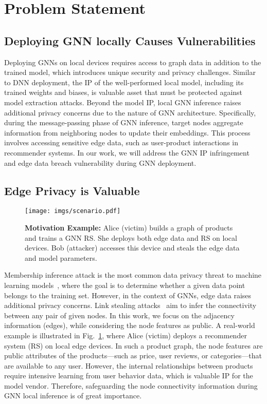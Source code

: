 \section{Problem Statement} \label{sec: statement}


\subsection{Deploying GNN locally Causes Vulnerabilities} \label{ps: gnn inference}
Deploying GNNs on local devices requires access to graph data in addition to the trained model, which introduces unique security and privacy challenges. 
Similar to DNN deployment, the IP of the well-performed local model, including its trained weights and biases, is valuable asset that must be protected against model extraction attacks.
Beyond the model IP, local GNN inference raises additional privacy concerns due to the nature of GNN architecture. 
Specifically, during the message-passing phase of GNN inference, target nodes aggregate information from neighboring nodes to update their embeddings. 
This process involves accessing sensitive edge data, such as user-product interactions in recommender systems.
In our work, we will address the GNN IP infringement and edge data breach vulnerability during GNN deployment.

\subsection{Edge Privacy is Valuable} \label{motivation: edge importance}

\begin{figure}[t]
    \centering
    \texttt{[image: imgs/scenario.pdf]}
    \caption{\textbf{Motivation Example:} Alice (victim) builds a graph of products and trains a GNN RS. She deploys both edge data and RS on local devices. Bob (attacker) accesses this device and steals the edge data and model parameters.}
    \label{fig: problem-statement}
\end{figure}

Membership inference attack is the most common data privacy threat to machine learning models~\cite{shokri2017membership}, where the goal is to determine whether a given data point belongs to the training set. 
However, in the context of GNNs, edge data raises additional privacy concerns. 
Link stealing attacks~\cite{he2021stealing, ding2023vertexserum} aim to infer the connectivity between any pair of given nodes. 
In this work, we focus on the adjacency information (edges), while considering the node features as public.
A real-world example is illustrated in Fig.~\ref{fig: problem-statement}, where Alice (victim) deploys a recommender system (RS) on local edge devices. 
In such a product graph, the node features are public attributes of the products—such as price, user reviews, or categories—that are available to any user. 
However, the internal relationships between products require intensive learning from user behavior data, which is valuable IP for the model vendor. 
Therefore, safeguarding the node connectivity information during GNN local inference is of great importance.


